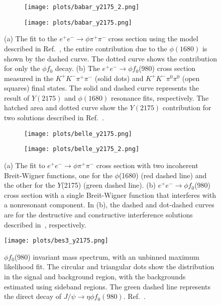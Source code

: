 \begin{center}
\null
\vfill
\begin{figure}[H]
    \centering
    \begin{subfigure}[b]{0.5\textwidth}
        \texttt{[image: plots/babar\_y2175\_2.png]}
        \caption{}
        \label{fig.1.4.1.a}
    \end{subfigure}\hfill
    \begin{subfigure}[b]{0.5\textwidth}
        \texttt{[image: plots/babar\_y2175.png]}
        \caption{}
        \label{fig.1.4.1.b}
     \end{subfigure}
     \caption{(a) The fit to the $e^{+}e^{-}\rightarrow \phi \pi^{+} \pi^{-}$ cross section using the model described in Ref.~\cite{Aubert12}, the entire contribution due to the $\phi(1680)$ is shown by the dashed curve. The dotted curve shows the contribution for only the $\phi f_0$ decay. (b) The $e^+e^- \rightarrow \phi f_0$(980) cross section measured in the $K^{+}K^{-}\pi^{+}\pi^{-}$ (solid dots) and $K^{+}K^{-}\pi^{0}\pi^{0}$ (open squares) final states. The solid and dashed curve represents the result of $Y(2175)$ and $\phi(1680)$ resonance fits, respectively. The hatched area and dotted curve show the $Y(2175)$ contribution for two solutions described in Ref.~\cite{Aubert12}. }
    \label{fig.1.4.1}
\end{figure}
\null
\vfill
\end{center}

\begin{figure}[H]
    \centering
    \begin{subfigure}[b]{0.51\textwidth}
        \texttt{[image: plots/belle\_y2175.png]}
        \caption{}
        \label{fig.1.4.2.a}
    \end{subfigure}\hfill
    \begin{subfigure}[b]{0.49\textwidth}
        \texttt{[image: plots/belle\_y2175\_2.png]}
        \caption{}
        \label{fig.1.4.2.b}
     \end{subfigure}
     \caption{(a) The fit to $e^+e^- \rightarrow \phi \pi^+\pi^-$ cross section with two incoherent Breit-Wigner functions, one for the $\phi$(1680) (red dashed line) and the other for the $Y$(2175) (green dashed line). (b) $e^+e^- \rightarrow \phi f_0$(980) cross section with a single Breit-Wigner function that interferes with a nonresonant component. In (b), the dashed and dot-dashed curves are for the destructive and constructive interference solutions described in~\cite{Shen09}, respectively.}
     \label{fig.1.4.2}
\end{figure}

\begin{figure}[H]
    \centering
        \texttt{[image: plots/bes3\_y2175.png]}
        \caption{$\phi f_0$(980) invariant mass spectrum, with an unbinned maximum likelihood fit. The circular and triangular dots show the distribution in the signal and background region, with the backgrounds estimated using sideband regions. The green dashed line represents the direct decay of $J/\psi \rightarrow \eta \phi f_0(980)$. Ref.~\cite{Ablikim15}.}
        \label{fig.1.4.3}
\end{figure}
